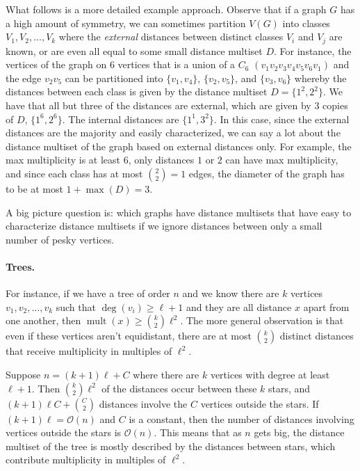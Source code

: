 \documentclass[12]{article}
\DeclareMathOperator{\mult}{mult}
\theoremstyle{definition}
\begin{document}
	What follows is a more detailed example approach.  Observe that if a graph $G$ has a high amount of symmetry, we can sometimes partition $V(G)$ into classes $V_1, V_2, \ldots, V_k$ where the \textit{external} distances between distinct classes $V_i$ and $V_j$ are known, or are even all equal to some small distance multiset $D$.  For instance, the vertices of the graph on $6$ vertices that is a union of a $C_6$ $(v_1v_2v_3v_4v_5v_6v_1)$ and the edge $v_2v_5$ can be partitioned into $\{v_1,v_4\}$, $\{v_2,v_5\}$, and $\{v_3,v_6\}$ whereby the distances between each class is given by the distance multiset $D = \{1^2,2^2\}$.  We have that all but three of the distances are external, which are given by $3$ copies of $D$, $\{1^6,2^6\}$.  The internal distances are $\{1^1,3^2\}$.  In this case, since the external distances are the majority and easily characterized, we can say a lot about the distance multiset of the graph based on external distances only.  For example, the max multiplicity is at least $6$, only distances $1$ or $2$ can have max multiplicity, and since each class has at most ${2 \choose 2} = 1$ edges, the diameter of the graph has to be at most $1 + \max(D) = 3$.
	
	A big picture question is: which graphs have distance multisets that have easy to characterize distance multisets if we ignore distances between only a small number of pesky vertices.  
	
	\paragraph{Trees.} For instance, if we have a tree of order $n$ and we know there are $k$ vertices $v_1, v_2, \ldots, v_k$ such that $\deg(v_i) \geq \ell+1$ and they are all distance $x$ apart from one another, then $\mult(x) \geq {k \choose 2} \ell^2$.  The more general observation is that even if these vertices aren't equidistant, there are at most ${k \choose 2}$ distinct distances that receive multiplicity in multiples of $\ell^2$.
	
	Suppose $n = (k+1)\ell + C$ where there are $k$ vertices with degree at least $\ell + 1$.  Then ${k \choose 2}\ell^2$ of the distances occur between these $k$ stars, and $(k+1)\ell C + {C \choose 2}$ distances involve the $C$ vertices outside the stars.  If $(k+1)\ell = \mathcal{O}(n)$ and $C$ is a constant, then the number of distances involving vertices outside the stars is $\mathcal{O}(n)$.  This means that as $n$ gets big, the distance multiset of the tree is mostly described by the distances between stars, which contribute multiplicity in multiples of $\ell^2$.
	
\end{document}

